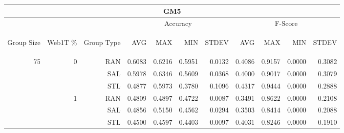 \begin{center}
\begin{table}[htbp] 
 \begin{center}
\begin{tabular}{ | r | r | r | r | r | r | r | r | r | r | r |}
\hline
\multicolumn{11}{|c|}{GM5}\\
\hline
 & & & \multicolumn{4}{|c|}{Accuracy} & \multicolumn{4}{|c|}{F-Score}\\ \cline{4-11}
\begin{sideways}Group Size\end{sideways} & \begin{sideways}Web1T \%\end{sideways} & \begin{sideways}Group Type\end{sideways} & \begin{sideways}AVG\end{sideways} & \begin{sideways}MAX\end{sideways} & \begin{sideways}MIN\end{sideways} & \begin{sideways}STDEV\end{sideways} & \begin{sideways}AVG\end{sideways} & \begin{sideways}MAX\end{sideways} & \begin{sideways}MIN\end{sideways} & \begin{sideways}STDEV\end{sideways}\\
\hline
\multirow{18}{*}{75}
 & \multirow{3}{*}{0} & RAN & 0.6083 & 0.6216 & 0.5951 & 0.0132 & 0.4086 & 0.9157 & 0.0000 & 0.3082\\ \cline{3-11}
 &   & SAL & 0.5978 & 0.6346 & 0.5609 & 0.0368 & 0.4000 & 0.9017 & 0.0000 & 0.3079\\ \cline{3-11}
 &   & STL & 0.4877 & 0.5973 & 0.3780 & 0.1096 & 0.4317 & 0.9444 & 0.0000 & 0.2888\\ \cline{2-11}
 & \multirow{3}{*}{1} & RAN & 0.4809 & 0.4897 & 0.4722 & 0.0087 & 0.3491 & 0.8622 & 0.0000 & 0.2108\\ \cline{3-11}
 &   & SAL & 0.4856 & 0.5150 & 0.4562 & 0.0294 & 0.3503 & 0.8414 & 0.0000 & 0.2088\\ \cline{3-11}
 &   & STL & 0.4500 & 0.4597 & 0.4403 & 0.0097 & 0.4031 & 0.8246 & 0.0000 & 0.1910\\ \cline{2-11}

\end{tabular}
\end{center}
\end{table}
\end{center}
